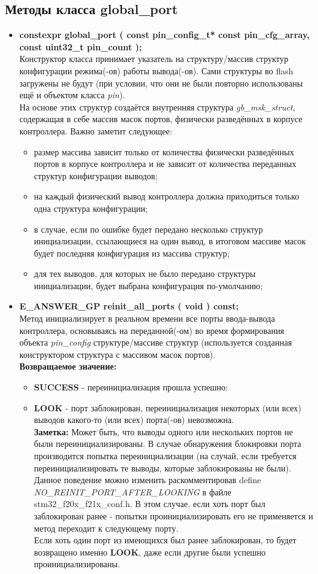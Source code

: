 \subsection{Методы класса global\_port}
\begin{itemize}
	\item \textbf{constexpr	global\_port	( const pin\_config\_t* const pin\_cfg\_array, const uint32\_t pin\_count );
	}\\Конструктор класса принимает указатель на структуру/массив структур конфигурации режима(-ов) работы  вывода(-ов). Сами структуры во flash загружены не будут (при условии, что они не были повторно использованы ещё и объектом класса \textit{pin}).\\На основе этих структур создаётся внутренняя структура \textit{gb\_msk\_struct}, содержащая в себе массив масок портов, физически разведённых в корпусе контроллера. Важно заметит следующее:
	\begin{itemize}
		\item размер массива зависит только от количества физически разведённых портов в корпусе контроллера и не зависит от количества переданных структур конфигурации выводов;
		\item на каждый физический вывод контроллера должна приходиться только одна структура конфигурации;
		\item в случае, если по ошибке будет передано несколько структур инициализации, ссылающиеся на один вывод, в итоговом массиве масок будет последняя конфигурация из массива структур;
		\item для тех выводов, для которых не было передано структуры инициализации, будет выбрана конфигурация по-умолчанию;
	\end{itemize}
	\item \textbf{E\_ANSWER\_GP	reinit\_all\_ports	( void ) const;}\\Метод инициализирует в реальном времени все порты ввода-вывода контроллера, основываясь на переданной(-ом) во время формирования объекта \textit{pin\_config} структуре/массиве структур (используется созданная конструктором структура с массивом масок портов).\\\textbf{Возвращаемое значение:}
	\begin{itemize}
		\item \textbf{SUCCESS} - переинициализация прошла успешно:	
		\item \textbf{LOOK} - порт заблокирован, переинициализация некоторых (или всех) выводов какого-то (или всех) порта(-ов) невозможна.\\\textbf{Заметка: } Может быть, что выводы одного или нескольких портов не были переинициализированы. В случае обнаружения блокировки порта производится попытка переинициализации (на случай, если требуется переинициализировать те выводы, которые заблокированы не были). Данное поведение можно изменить раскомментировав define \textit{NO\_REINIT\_PORT\_AFTER\_LOOKING} в файле stm32\_f20x\_f21x\_conf.h. В этом случае, если хоть порт был заблокирован ранее - попытки проинициализировать его не применяется и метод переходит к следующему порту.\\Если хоть один порт из имеющихся был ранее заблокирован, то будет возвращено именно \textbf{LOOK}, даже если другие были успешно проинициализированы.

\end{itemize}
\end{itemize}
